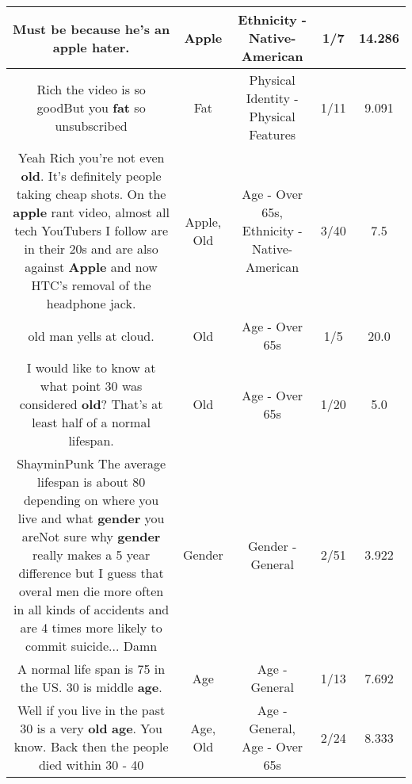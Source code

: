 \documentclass[11pt]{article}
\newlength\mylength
\begin{document}
\begin{center}
\begin{longtable}{|C{.65\mylength}|C{.30\mylength}|C{.12\mylength}|C{.12\mylength}|C{.12\mylength}|}
  \small Must be because he's an \textbf{apple} hater.\normalsize   & Apple & Ethnicity - Native-American & 1/7 & 14.286 \\  \hline
  \small Rich the video is so goodBut you \textbf{fat} so unsubscribed\normalsize   & Fat & Physical Identity - Physical Features & 1/11 & 9.091 \\  \hline
  \small Yeah Rich you're not even \textbf{old}. It's definitely people taking cheap shots. On the \textbf{apple} rant video, almost all tech YouTubers I follow are in their 20s and are also against \textbf{Apple} and now HTC's removal of the headphone jack.\normalsize   & Apple, Old & Age - Over 65s, Ethnicity - Native-American & 3/40 & 7.5 \\  \hline
  \small old man yells at cloud.\normalsize   & Old & Age - Over 65s & 1/5 & 20.0 \\  \hline
  \small I would like to know at what point 30 was considered \textbf{old}? That's at least half of a normal lifespan.\normalsize   & Old & Age - Over 65s & 1/20 & 5.0 \\  \hline
  \small ShayminPunk The average lifespan is about 80 depending on where you live and what \textbf{gender} you areNot sure why \textbf{gender} really makes a 5 year difference but I guess that overal men die more often in all kinds of accidents and are 4 times more likely to commit suicide... Damn\normalsize   & Gender & Gender - General & 2/51 & 3.922 \\  \hline
  \small A normal life span is 75 in the US. 30 is middle \textbf{age}.\normalsize   & Age & Age - General & 1/13 & 7.692 \\  \hline
  \small Well if you live in the past 30 is a very \textbf{old} \textbf{age}. You know. Back then the people died within 30 - 40\normalsize   & Age, Old & Age - General, Age - Over 65s & 2/24 & 8.333 \\  \hline

\end{longtable}
\end{center}
\end{document}
